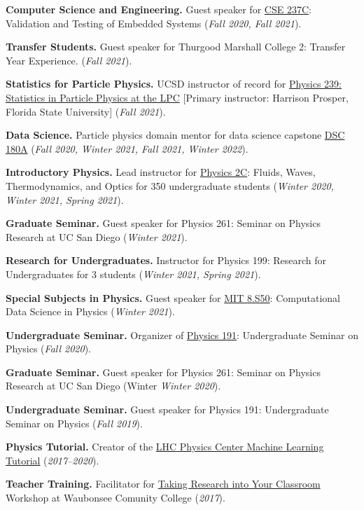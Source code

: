 \documentclass{res}
\begin{document}
\begin{resume}
  \textbf{Computer Science and Engineering.} Guest speaker for \href{http://kastner.ucsd.edu/ryan/cse237c/}{CSE 237C}: Validation and Testing of Embedded Systems (\textit{Fall 2020, Fall 2021}).

  \textbf{Transfer Students.} Guest speaker for Thurgood Marshall College 2: Transfer Year Experience. (\textit{Fall 2021}).

  \textbf{Statistics for Particle Physics.} UCSD instructor of record for \href{https://indico.cern.ch/event/1066958/}{Physics 239: Statistics in Particle Physics at the LPC} [Primary instructor: Harrison Prosper, Florida State University] (\textit{Fall 2021}).

  \textbf{Data Science.} Particle physics domain mentor for data science capstone \href{https://jmduarte.github.io/capstone-particle-physics-domain}{DSC 180A} (\textit{Fall 2020, Winter 2021, Fall 2021, Winter 2022}).

  \textbf{Introductory Physics.} Lead instructor for \href{https://jduarte.physics.ucsd.edu/phys2c/index.html}{Physics 2C}: Fluids, Waves, Thermodynamics, and Optics for 350 undergraduate students (\textit{Winter 2020, Winter 2021, Spring 2021}).

  \textbf{Graduate Seminar.} Guest speaker for Physics 261: Seminar on Physics Research at UC San Diego (\textit{Winter 2021}).

  \textbf{Research for Undergraduates.} Instructor for Physics 199: Research for Undergraduates for 3 students (\textit{Winter 2021, Spring 2021}).

  \textbf{Special Subjects in Physics.} Guest speaker for \href{https://github.com/violatingcp/MIT_8.S50}{MIT 8.S50}: Computational Data Science in Physics (\textit{Winter 2021}).

  \textbf{Undergraduate Seminar.} Organizer of \href{https://indico.cern.ch/event/956641/}{Physics 191}: Undergraduate Seminar on Physics (\textit{Fall 2020}).

  \textbf{Graduate Seminar.} Guest speaker for Physics 261: Seminar on Physics Research at UC San Diego (Winter \textit{Winter 2020}).

  \textbf{Undergraduate Seminar.} Guest speaker for Physics 191: Undergraduate Seminar on Physics (\textit{Fall 2019}).

  \textbf{Physics Tutorial.} Creator of the \href{https://github.com/FNALLPC/machine-learning-hats}{LHC Physics Center Machine Learning Tutorial} (\textit{2017--2020}).

  \textbf{Teacher Training.} Facilitator for \href{http://eddata.fnal.gov/lasso/program_search/show_workshopID_new.lasso?event_id=435}{Taking Research into Your Classroom} Workshop at Waubonsee Comunity College (\textit{2017}).


\end{resume}
\end{document}
